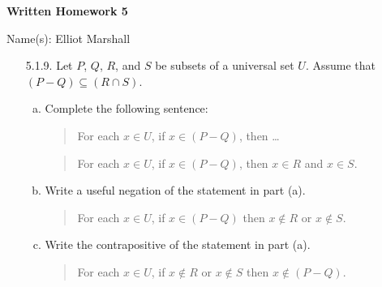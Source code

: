 \documentclass[11pt]{article}
\begin{document}
\centerline{\bf Written Homework 5}


\centerline{Name(s): Elliot Marshall}

\begin{itemize}
\begin{comment}
\item[4.3.10.] The sequence in Exercise~4.3.9 is an example of an \emph{arithmetic sequence}. An arithmetic sequence is defined as follows:

Let $c$ and $d$ be real numbers. Define the sequence $a_1,a_2,\dots, a_n,\dots$ by $a_1=c$ and for each $n\in \mathbb{N}$, $a_{n+1}=a_n+d$.
\begin{enumerate}[(a)]
\item Determine formulas for $a_3$ through $a_8$.
\item Make a conjecture for a formula for $a_n$ for each $n\in\mathbb{N}$.
\item Prove that your conjecture in the previous part is true.
\end{enumerate}

\hrulefill\end{comment}

\item[5.1.9.] Let $P$, $Q$, $R$, and $S$ be subsets of a universal set $U$. Assume that $(P-Q)\subseteq(R\cap S)$.
\begin{enumerate}[(a)]
\item Complete the following sentence:
\begin{quote}
For each $x\in U$, if $x\in(P-Q)$, then \dots
\end{quote}
\begin{quote}
For each $x\in U$, if $x\in(P-Q)$, then $x\in R$ and $x\in S$.
\end{quote}

\item Write a useful negation of the statement in part (a). 
\begin{quote}
For each $x\in U$, if $x\in(P-Q)$ then $x\not\in R$ or $x\not\in S$.
\end{quote}

\item Write the contrapositive of the statement in part (a).
\begin{quote}
For each $x\in U$, if $x\not\in R$ or $x\not\in S$ then $x\not\in(P-Q)$.
\end{quote}
\end{enumerate}


\hrulefill


\end{itemize}
\end{document}
